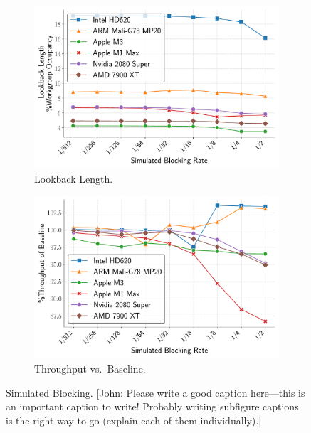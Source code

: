 \documentclass[acmsmall, manuscript, screen, review, anonymous]{acmart}
\newcommand{\john}[1]{{\footnotesize\color{cyan}[John: #1]}}
\begin{document}
\begin{figure}
  \vspace{0.2em}

  \begin{subfigure}[t]{0.48\linewidth}
    \centering
    \includegraphics[width=\linewidth]{graphics/lookbackLength_plot.pdf}
    \caption{Lookback Length.\label{fig:lookback_length}}
  \end{subfigure}\hfill
  \begin{subfigure}[t]{0.48\linewidth}
    \centering
    \includegraphics[width=\linewidth]{graphics/time_plot.pdf}
    \caption{Throughput vs.\ Baseline.\label{fig:execution_time}}
  \end{subfigure}

  \caption{Simulated Blocking. \john{Please write a good caption here---this is an important caption to write! Probably writing subfigure captions is the right way to go (explain each of them individually).}\label{fig:vertical_images}}
\end{figure}
\end{document}
